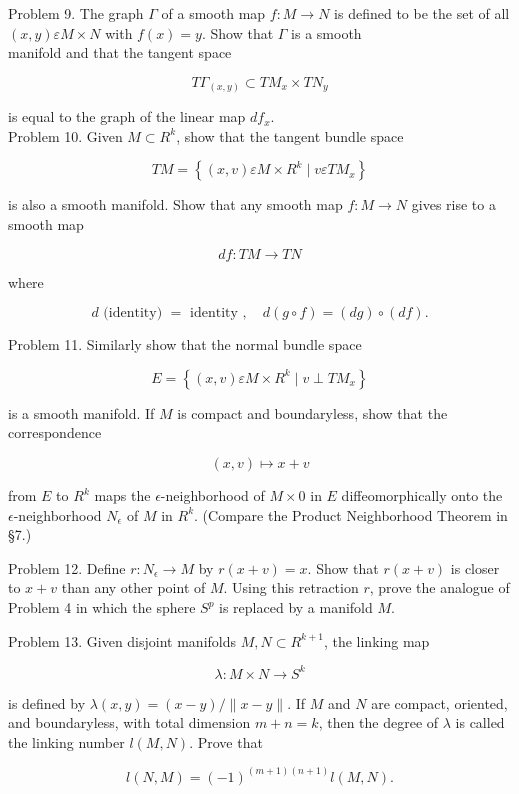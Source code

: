 \documentclass[10pt, letterpaper]{article}
\begin{document}
Problem 9. The graph $\Gamma$ of a smooth map $f: M \rightarrow N$ is defined to be the set of all $(x, y) \varepsilon M \times N$ with $f(x)=y$. Show that $\Gamma$ is a smooth\\
manifold and that the tangent space

$$
T \Gamma_{(x, y)} \subset T M_{x} \times T N_{y}
$$

is equal to the graph of the linear map $d f_{x}$.\\
Problem 10. Given $M \subset R^{k}$, show that the tangent bundle space

$$
T M=\left\{(x, v) \varepsilon M \times R^{k} \mid v \varepsilon T M_{x}\right\}
$$

is also a smooth manifold. Show that any smooth map $f: M \rightarrow N$ gives rise to a smooth map

$$
d f: T M \rightarrow T N
$$

where

$$
d \text { (identity) }=\text { identity }, \quad d(g \circ f)=(d g) \circ(d f) .
$$

Problem 11. Similarly show that the normal bundle space

$$
E=\left\{(x, v) \varepsilon M \times R^{k} \mid v \perp T M_{x}\right\}
$$

is a smooth manifold. If $M$ is compact and boundaryless, show that the correspondence

$$
(x, v) \mapsto x+v
$$

from $E$ to $R^{k}$ maps the $\epsilon$-neighborhood of $M \times 0$ in $E$ diffeomorphically onto the $\epsilon$-neighborhood $N_{\epsilon}$ of $M$ in $R^{k}$. (Compare the Product Neighborhood Theorem in §7.)

Problem 12. Define $r: N_{\epsilon} \rightarrow M$ by $r(x+v)=x$. Show that $r(x+v)$ is closer to $x+v$ than any other point of $M$. Using this retraction $r$, prove the analogue of Problem 4 in which the sphere $S^{p}$ is replaced by a manifold $M$.

Problem 13. Given disjoint manifolds $M, N \subset R^{k+1}$, the linking map

$$
\lambda: M \times N \rightarrow S^{k}
$$

is defined by $\lambda(x, y)=(x-y) /\|x-y\|$. If $M$ and $N$ are compact, oriented, and boundaryless, with total dimension $m+n=k$, then the degree of $\lambda$ is called the linking number $l(M, N)$. Prove that

$$
l(N, M)=(-1)^{(m+1)(n+1)} l(M, N) .
$$
\end{document}
